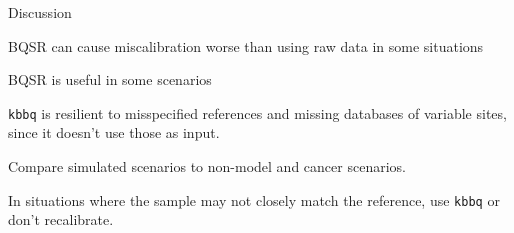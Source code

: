 \documentclass{article}
\begin{document}
\begin{outline}
	\item Discussion
	\begin{outline}
		\item BQSR can cause miscalibration worse than using raw data in some situations
		\item BQSR is useful in some scenarios
		\item \texttt{kbbq} is resilient to misspecified references and missing databases of variable sites, since it doesn't use those as input.
		\item Compare simulated scenarios to non-model and cancer scenarios.
		\begin{outline}
			\item In situations where the sample may not closely match the reference, use \texttt{kbbq} or don't recalibrate.
		\end{outline}
	\end{outline}
\end{outline}
\end{document}

